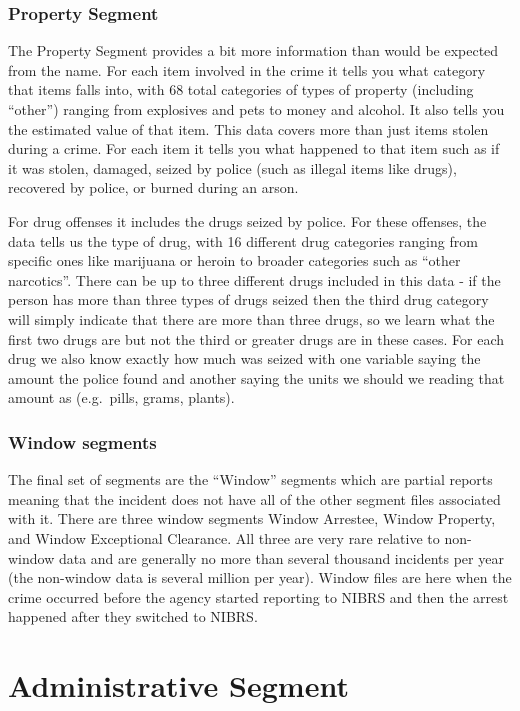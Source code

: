 \documentclass[
]{krantz}
\begin{document}
\subsection{Property Segment}\label{property-segment}

The Property Segment provides a bit more information than
would be expected from the name. For each item involved in
the crime it tells you what category that items falls into,
with 68 total categories of types of property (including
``other'') ranging from explosives and pets to money and
alcohol. It also tells you the estimated value of that item.
This data covers more than just items stolen during a crime.
For each item it tells you what happened to that item such
as if it was stolen, damaged, seized by police (such as
illegal items like drugs), recovered by police, or burned
during an arson.

For drug offenses it includes the drugs seized by police.
For these offenses, the data tells us the type of drug, with
16 different drug categories ranging from specific ones like
marijuana or heroin to broader categories such as ``other
narcotics''. There can be up to three different drugs
included in this data - if the person has more than three
types of drugs seized then the third drug category will
simply indicate that there are more than three drugs, so we
learn what the first two drugs are but not the third or
greater drugs are in these cases. For each drug we also know
exactly how much was seized with one variable saying the
amount the police found and another saying the units we
should we reading that amount as (e.g.~pills, grams,
plants).

\subsection{Window segments}\label{window}

The final set of segments are the ``Window'' segments which
are partial reports meaning that the incident does not have
all of the other segment files associated with it. There are
three window segments Window Arrestee, Window Property, and
Window Exceptional Clearance. All three are very rare
relative to non-window data and are generally no more than
several thousand incidents per year (the non-window data is
several million per year). Window files are here when the
crime occurred before the agency started reporting to NIBRS
and then the arrest happened after they switched to NIBRS.

\chapter{Administrative
Segment}\label{administrative-segment-1}
\end{document}
